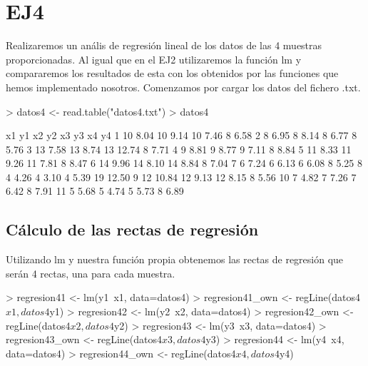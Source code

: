 \documentclass [a4paper] {article}
\begin{document}
\newpage
\section{EJ4}
Realizaremos un anális de regresión lineal de los datos de las 4 muestras proporcionadas.
Al igual que en el EJ2 utilizaremos la función lm y compararemos los resultados de esta con los obtenidos por las funciones que hemos implementado nosotros.
Comenzamos por cargar los datos del fichero .txt.
\begin{Schunk}
\begin{Sinput}
> datos4 <- read.table("datos4.txt")
> datos4
\end{Sinput}
\begin{Soutput}
   x1    y1 x2   y2 x3    y3 x4    y4
1  10  8.04 10 9.14 10  7.46  8  6.58
2   8  6.95  8 8.14  8  6.77  8  5.76
3  13  7.58 13 8.74 13 12.74  8  7.71
4   9  8.81  9 8.77  9  7.11  8  8.84
5  11  8.33 11 9.26 11  7.81  8  8.47
6  14  9.96 14 8.10 14  8.84  8  7.04
7   6  7.24  6 6.13  6  6.08  8  5.25
8   4  4.26  4 3.10  4  5.39 19 12.50
9  12 10.84 12 9.13 12  8.15  8  5.56
10  7  4.82  7 7.26  7  6.42  8  7.91
11  5  5.68  5 4.74  5  5.73  8  6.89
\end{Soutput}
\end{Schunk}
\subsection{Cálculo de las rectas de regresión}
Utilizando lm y nuestra función propia obtenemos las rectas de regresión que serán 4 rectas, una para cada muestra.
\begin{Schunk}
\begin{Sinput}
> regresion41 <- lm(y1~x1, data=datos4)
> regresion41_own <- regLine(datos4$x1, datos4$y1)
> regresion42 <- lm(y2~x2, data=datos4)
> regresion42_own <- regLine(datos4$x2, datos4$y2)
> regresion43 <- lm(y3~x3, data=datos4)
> regresion43_own <- regLine(datos4$x3, datos4$y3)
> regresion44 <- lm(y4~x4, data=datos4)
> regresion44_own <- regLine(datos4$x4, datos4$y4)
\end{Sinput}
\end{Schunk}
\end{document}
